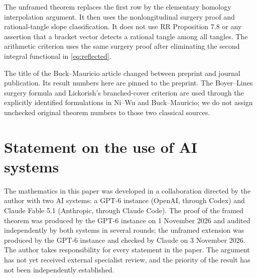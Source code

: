 \documentclass[11pt]{amsart}
\theoremstyle{definition}
\theoremstyle{remark}
\begin{document}
The unframed theorem replaces the first row by the elementary homology
interpolation argument. It then uses the nonlongitudinal surgery proof
and rational-tangle slope classification. It does not use RR Proposition
7.8 or any assertion that a bracket vector detects a rational tangle among
all tangles. The arithmetic criterion uses the same surgery proof after
eliminating the second integral functional in \eqref{eq:reflected}.

The title of the Buck--Mauricio article changed between preprint and
journal publication. Its result numbers here are pinned to the preprint.
The Boyer--Lines surgery formula and Lickorish's branched-cover criterion
are used through the explicitly identified formulations in Ni--Wu and
Buck--Mauricio; we do not assign unchecked original theorem numbers to
those two classical sources.

\section*{Statement on the use of AI systems}
The mathematics in this paper was developed in a collaboration directed by the author with two AI systems: a GPT-6 instance (OpenAI, through Codex) and Claude Fable 5.1 (Anthropic, through Claude Code). The proof of the framed theorem was produced by the GPT-6 instance on 1 November 2026 and audited independently by both systems in several rounds; the unframed extension was produced by the GPT-6 instance and checked by Claude on 3 November 2026. The author takes responsibility for every statement in the paper. The argument has not yet received external specialist review, and the priority of the result has not been independently established.
\end{document}
